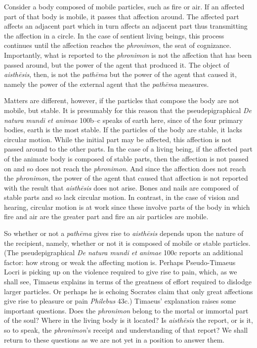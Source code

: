 Consider a body composed of mobile particles, such as fire or air. If an affected part of that body is mobile, it passes that affection around. The affected part affects an adjacent part which in turn affects an adjacent part thus transmitting the affection in a circle. In the case of sentient living beings, this process continues until the affection reaches the \emph{phronimon}, the seat of cognizance. Importantly, what is reported to the \emph{phronimon} is not the affection that has been passed around, but the power of the agent that produced it. The object of \emph{aisthēsis}, then, is not the \emph{pathēma} but the power of the agent that caused it, namely the power of the external agent that the \emph{pathēma} measures.

Matters are different, however, if the particles that compose the body are not mobile, but stable. It is presumably for this reason that the pseudepigraphical \emph{De natura mundi et animae} 100b--c speaks of earth here, since of the four primary bodies, earth is the most stable. If the particles of the body are stable, it lacks circular motion. While the initial part may be affected, this affection is not passed around to the other parts. In the case of a living being, if the affected part of the animate body is composed of stable parts, then the affection is not passed on and so does not reach the \emph{phronimon}. And since the affection does not reach the \emph{phronimon}, the power of the agent that caused that affection is not reported with the result that \emph{aisthēsis} does not arise. Bones and nails are composed of stable parts and so lack circular motion. In contrast, in the case of vision and hearing, circular motion is at work since these involve parts of the body in which fire and air are the greater part and fire an air particles are mobile.

So whether or not a \emph{pathēma} gives rise to \emph{aisthēsis} depends upon the nature of the recipient, namely, whether or not it is composed of mobile or stable particles. (The pseudepigraphical \emph{De natura mundi et animae} 100c reports an additional factor: how strong or weak the affecting motion is. Perhaps Pseudo-Timaeus Locri is picking up on the violence required to give rise to pain, which, as we shall see, Timaeus explains in terms of the greatness of effort required to dislodge larger particles. Or perhaps he is echoing Socrates claim that only great affections give rise to pleasure or pain \emph{Philebus} 43c.) Timaeus' explanation raises some important questions. Does the \emph{phronimon} belong to the mortal or immortal part of the soul? Where in the living body is it located? Is \emph{aisthēsis} the report, or is it, so to speak, the \emph{phronimon}'s receipt and understanding of that report? We shall return to these questions as we are not yet in a position to answer them.

